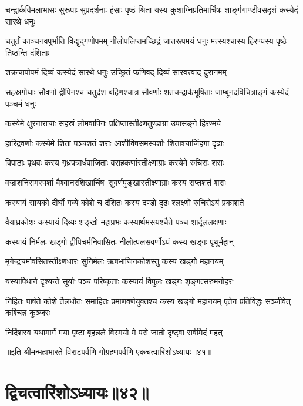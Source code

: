 \threelineshloka
{चन्द्रार्कविमलाभासः सुरूपाः सुप्रदर्शनाः}
{हंसाः पृष्ठं श्रिता यस्य कुशाग्निप्रतिमार्चिषः}
{शार्ङ्गगाण्डीवसदृशं कस्येदं सारथे धनुः}


\threelineshloka
{चतुर्तं काञ्चनवपुर्भाति विद्युद्गणोपमम्}
{नीलोपलिप्तमच्छिद्रं जातरूपमयं धनुः}
{मत्स्यश्चास्य हिरण्यस्य पृष्ठे तिष्ठन्ति दंशिताः}


\twolineshloka
{शक्रचापोपमं दिव्यं कस्येदं सारथे धनुः}
{उच्छ्रितं फणिवद् दिव्यं सारवत्त्वाद् दुरानमम्}


\threelineshloka
{सहस्रगोधाः सौवर्णा द्वीपिनश्च चतुर्दश}
{बर्हिणश्चात्र सौवर्णाः शतचन्द्रार्कभूषिताः}
{जाम्बूनदविचित्राङ्गं कस्येदं पञ्चमं धनुः}


\twolineshloka
{कस्येमे क्षुरनाराचाः सहस्रं लोमवापिनः}
{प्रक्षिप्तास्तीक्ष्णतुण्डाग्रा उपासङ्गे हिरण्मये}


\twolineshloka
{हारिद्रवर्णाः कस्येमे शिता पञ्चशतं शराः}
{आशीविषसमस्पर्शाः शिताश्चाजिंहगा दृढाः}


\twolineshloka
{विपाठाः पृथवः कस्य गृध्रपत्रार्धवाजिताः}
{वराहकर्णास्तीक्ष्णाग्राः कस्येमे रुचिराः शराः}


\twolineshloka
{वज्राशनिसमस्पर्शा वैश्वानरशिखार्चिषः}
{सुवर्णपुङ्खास्तीक्ष्णाग्राः कस्य सप्तशतं शराः}


\twolineshloka
{कस्यायं सायको दीर्घो गव्ये कोशे च दंशितः}
{कस्य दण्डो दृढः श्लक्ष्णो रुचिरोऽयं प्रकाशते}


\twolineshloka
{वैयाघ्रकोशः कस्यायं दिव्यः शङ्खो महाप्रभः}
{कस्यार्थमसयश्चैते पञ्च शार्दूललक्षणाः}


\twolineshloka
{कस्यायं निर्मलः खड्गो द्वीपिचर्मनिवासितः}
{नीलोत्पलसवर्णोऽयं कस्य खड्गः पृथुर्महान्}


\twolineshloka
{मृगेन्द्रचर्मावसितस्तीक्ष्णधारः सुनिर्मलः}
{ऋषभाजिनकोशस्तु कस्य खड्गो महानयम्}


\twolineshloka
{यस्यापिधाने दृश्यन्ते सूर्याः पञ्च परिष्कृताः}
{कस्यायं विपुलः खड्गः शृङ्गत्सरुमनोहरः}


\threelineshloka
{निहितः पार्षते कोशे तैलधौतः समाहितः}
{प्रमाणवर्णयुक्तश्च कस्य खड्गो महानयम्}
{एतेन प्रतिविद्धः सञ्जीवेत् कश्चिन्न कुञ्जरः}


\twolineshloka
{निर्दिशस्व यथामार्गं मया पृष्टा बृहन्नले}
{विस्मयो मे परो जातो दृष्ट्वा सर्वमिदं महत्}

॥इति श्रीमन्महाभारते विराटपर्वणि गोग्रहणपर्वणि एकचत्वारिंशोऽध्यायः॥४१॥

\chapter{द्विचत्वारिंशोऽध्यायः॥४२॥}

